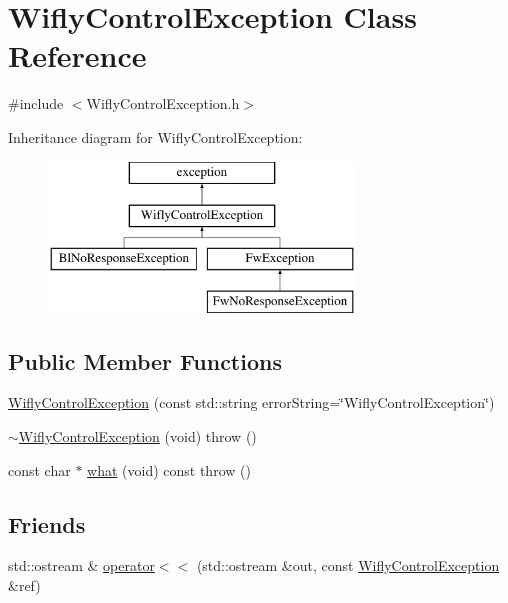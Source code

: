 \hypertarget{class_wifly_control_exception}{\section{Wifly\-Control\-Exception Class Reference}
\label{class_wifly_control_exception}
}


{\ttfamily \#include $<$Wifly\-Control\-Exception.\-h$>$}

Inheritance diagram for Wifly\-Control\-Exception\-:\begin{figure}[H]
\begin{center}
\leavevmode
\includegraphics[height=4.000000cm]{class_wifly_control_exception}
\end{center}
\end{figure}
\subsection*{Public Member Functions}
\begin{DoxyCompactItemize}
\item 
\hyperlink{class_wifly_control_exception_a7c12735a818b900b9b5edb6ee5e0e305}{Wifly\-Control\-Exception} (const std\-::string error\-String=\char`\"{}Wifly\-Control\-Exception\char`\"{})
\item 
\hyperlink{class_wifly_control_exception_a93f14897c8f27829a66980d1a2c7ab2c}{$\sim$\-Wifly\-Control\-Exception} (void)  throw ()
\item 
const char $\ast$ \hyperlink{class_wifly_control_exception_a0fa2a5e8db72e6927d29c82968319e78}{what} (void) const   throw ()
\end{DoxyCompactItemize}
\subsection*{Friends}
\begin{DoxyCompactItemize}
\item 
std\-::ostream \& \hyperlink{class_wifly_control_exception_a034f34beda1d9737d7276658c385f337}{operator$<$$<$} (std\-::ostream \&out, const \hyperlink{class_wifly_control_exception}{Wifly\-Control\-Exception} \&ref)
\end{DoxyCompactItemize}


